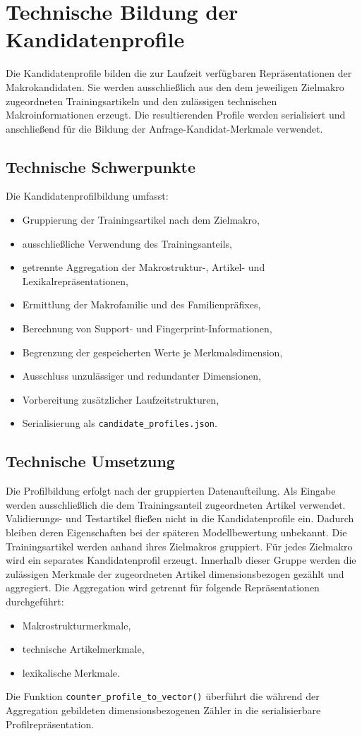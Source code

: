 \section{Technische Bildung der Kandidatenprofile} \label{sec:technische_bildung_der_kandidatenprofile} Die Kandidatenprofile bilden die zur Laufzeit verfügbaren Repräsentationen der Makrokandidaten. Sie werden ausschließlich aus den dem jeweiligen Zielmakro zugeordneten Trainingsartikeln und den zulässigen technischen Makroinformationen erzeugt. Die resultierenden Profile werden serialisiert und anschließend für die Bildung der Anfrage-Kandidat-Merkmale verwendet. \subsection{Technische Schwerpunkte} \label{subsec:technische_schwerpunkte_kandidatenprofile} Die Kandidatenprofilbildung umfasst: \begin{itemize} \item Gruppierung der Trainingsartikel nach dem Zielmakro, \item ausschließliche Verwendung des Trainingsanteils, \item getrennte Aggregation der Makrostruktur-, Artikel- und Lexikalrepräsentationen, \item Ermittlung der Makrofamilie und des Familienpräfixes, \item Berechnung von Support- und Fingerprint-Informationen, \item Begrenzung der gespeicherten Werte je Merkmalsdimension, \item Ausschluss unzulässiger und redundanter Dimensionen, \item Vorbereitung zusätzlicher Laufzeitstrukturen, \item Serialisierung als \texttt{candidate\_profiles.json}. \end{itemize} \subsection{Technische Umsetzung} \label{subsec:technische_umsetzung_kandidatenprofile} Die Profilbildung erfolgt nach der gruppierten Datenaufteilung. Als Eingabe werden ausschließlich die dem Trainingsanteil zugeordneten Artikel verwendet. Validierungs- und Testartikel fließen nicht in die Kandidatenprofile ein. Dadurch bleiben deren Eigenschaften bei der späteren Modellbewertung unbekannt. Die Trainingsartikel werden anhand ihres Zielmakros gruppiert. Für jedes Zielmakro wird ein separates Kandidatenprofil erzeugt. Innerhalb dieser Gruppe werden die zulässigen Merkmale der zugeordneten Artikel dimensionsbezogen gezählt und aggregiert. Die Aggregation wird getrennt für folgende Repräsentationen durchgeführt: \begin{itemize} \item Makrostrukturmerkmale, \item technische Artikelmerkmale, \item lexikalische Merkmale. \end{itemize} Die Funktion \texttt{counter\_profile\_to\_vector()} überführt die während der Aggregation gebildeten dimensionsbezogenen Zähler in die serialisierbare Profilrepräsentation. 